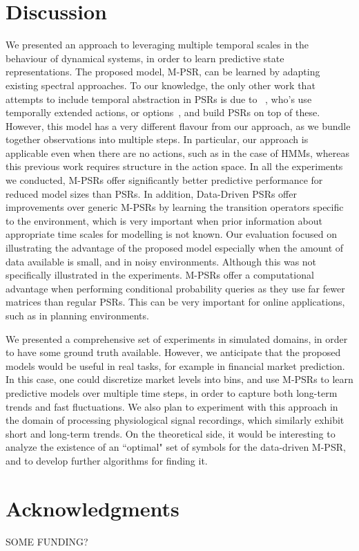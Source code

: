 \documentclass[letterpaper]{article}
\begin{document}
\section{Discussion}

We presented an approach to leveraging multiple temporal scales in the behaviour of dynamical systems, in order to learn predictive state representations.  The proposed model, M-PSR, can be learned by adapting existing spectral approaches.  To our knowledge, the only other work that attempts to include temporal abstraction in PSRs is due to ~\cite{wolfe06}, who's use temporally extended actions, or options~\cite{sutton99}, and build PSRs on top of these.  However, this model has a very different flavour from our approach, as we bundle together observations into multiple steps.  In particular, our approach is applicable even when there are no actions, such as in the case of HMMs, whereas this previous work requires structure in the action space.
In all the experiments we conducted, M-PSRs offer significantly better predictive performance for reduced model sizes than PSRs. In addition, Data-Driven PSRs offer improvements over generic M-PSRs by learning the transition operators specific to the environment, which is very important when prior information about appropriate time scales for modelling is not known.  Our evaluation focused on illustrating the advantage of the proposed model especially when the amount of data available is small, and in noisy environments.
 Although this was not specifically illustrated in the experiments. M-PSRs offer a computational advantage when performing conditional probability queries as they use far fewer matrices than regular PSRs. This can be very important for online applications, such as in planning environments. 
 
 We presented a comprehensive set of experiments in simulated domains, in order to have some ground truth available.  However, we anticipate that the proposed models would be useful in real tasks, for example in financial market prediction.  In this case, one could discretize market levels into bins, and use M-PSRs to learn predictive models over multiple time steps, in order to capture both long-term trends and fast fluctuations.  We also plan to experiment with this approach in the domain of processing physiological signal recordings, which similarly exhibit short and long-term trends.  On the theoretical side, it would be interesting to analyze the existence of an ``optimal" set of symbols for the data-driven M-PSR, and to develop further algorithms for finding it.

\section*{Acknowledgments}
SOME FUNDING?



\end{document}
